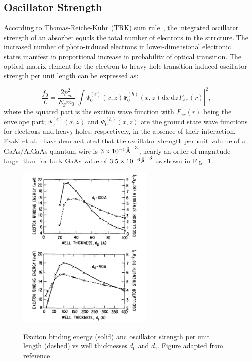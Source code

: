 \subsection{Oscillator Strength}

According to Thomas-Reiche-Kuhn (TRK) sum rule~\cite{wang1999generalization},
the integrated oscillator strength of an absorber equals the total number of
electrons in the structure. The increased number of photo-induced electrons in
lower-dimensional electronic states manifest in proportional increase in
probability of optical transition. The optical matrix element for the
electron-to-heavy hole transition induced oscillator strength per unit length
can be expressed as:

\begin{equation}
\frac{f_0}{L}=\frac{2{p_{cv}^2}}{{E_g}{m_0}}{|\int{\Psi_0^{(e)}}(x,z){\Psi_0^{(h)}}(x,z)\,{\mathrm{d}x}\,{\mathrm{d}z}\,F_{ex}(r)|}^2,
\label{eq:OscillatorStrength}
\end{equation}
where the squared part is the exciton wave function with $F_{ex}(r)$ being the
envelope part; ${\Psi_0^{(e)}}(x,z)$ and ${\Psi_0^{(h)}}(x,z)$ are the ground
state wave functions for electrons and heavy holes, respectively, in the
absence of their interaction. Esaki et al.~\cite{Chang:1985jz} have
demonstrated that the oscillator strength per unit volume of a GaAs/AlGaAs
quantum wire is $3 \times 10^{-5} {\text{\normalfont\AA}}^{-3}$, nearly an
order of magnitude larger than for bulk GaAs value of $3.5 \times 10^{-6}
{\text{\normalfont\AA}}^{-3}$ as shown in Fig.~\ref{OscillatorStrength}.

\begin{figure}
  \caption[Exciton binding energy (solid) and oscillator strength per unit length (dashed) vs well thicknesses $d_0$ and $d_1$.]{Exciton binding energy (solid) and oscillator strength per unit length (dashed) vs well thicknesses $d_0$ and $d_1$. Figure adapted from reference~\cite{Chang:1985jz}.}
  \centering
  \includegraphics[width=0.6\textwidth]{pictures/RM/OscillatorStrength}
  \label{OscillatorStrength}
\end{figure}

